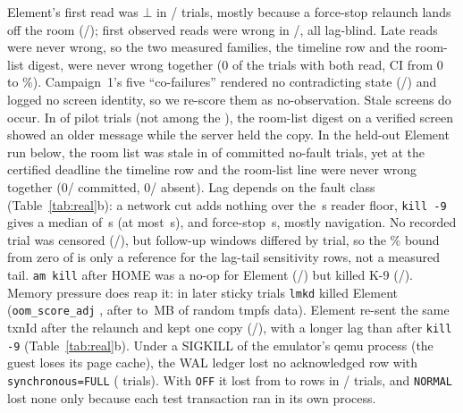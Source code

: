  Element's first read was $\bot$ in \RealFirstBot/\RealElemN{} trials, mostly because a force-stop relaunch lands off the room (\RealFsFirstBot/\RealFsN); first observed reads
were wrong in \RealFirstWrong/\RealFirstObs, all lag-blind. Late reads were never wrong, so the two measured families, the timeline row and the room-list digest, were never wrong together (0 of the \RealCoObs{} trials with both read, CI from 0 to \RealCoHi\%). Campaign~1's five ``co-failures'' rendered
no contradicting state (\RealOneCoContra/\RealOneCoN) and logged no screen identity, so we re-score them as
no-observation. Stale screens do occur. In \RealPilotStaleDigest{} of \RealPilotN{} pilot trials (not among the
\RealElemN), the room-list digest on a verified screen showed an older message while the server held the copy. In the held-out Element run below, the room list was stale in \RealElPlanStale{} of \RealElPlanStaleN{} committed no-fault trials, yet at the certified deadline the timeline row and the room-list line were never wrong together (0/\RealElPlanCoOne{} committed, 0/\RealElPlanCoZero{} absent). Lag depends on the fault class
(Table~\ref{tab:real}b): a network cut adds nothing over the \RealLagNofaultMed\,s reader floor, \texttt{kill -9} gives a median of \RealLagKillMed\,s (at most \RealLagKillMax\,s), and force-stop \RealLagFsMed\,s,
mostly navigation. No recorded trial was censored (\RealCensored/\RealElemN), but follow-up windows differed by trial, so the \RsimTail\% bound from zero of \RealElemN{} is only a reference
for the lag-tail sensitivity rows, not a measured tail.
\texttt{am kill} after HOME was a no-op for Element (\RealAmkillNoopElem/\RealAmkillNoopElem) but killed K-9 (\RealAmkillKnine/\RealAmkillKnine). Memory pressure does reap it: in \RealElmkN{} later sticky trials \texttt{lmkd} killed Element (\texttt{oom\_score\_adj} \RealElmkAdj, after \RealElmkMbLo{} to \RealElmkMbHi\,MB of random tmpfs data). Element re-sent the same txnId after the relaunch and kept one copy (\RealElmkOnce/\RealElmkN), with a longer lag than after \texttt{kill -9} (Table~\ref{tab:real}b). Under a SIGKILL of the
emulator's qemu process (the guest loses its page cache), the WAL ledger lost no acknowledged row with \texttt{synchronous=FULL} (\RealLedgerFullN{} trials). With \texttt{OFF} it lost
from \RealLedgerOffLostMin{} to \RealLedgerOffLostMax{} rows in \RealLedgerOffViol/\RealLedgerOffN{} trials, and \texttt{NORMAL} lost none only because each test transaction ran in its own process.

